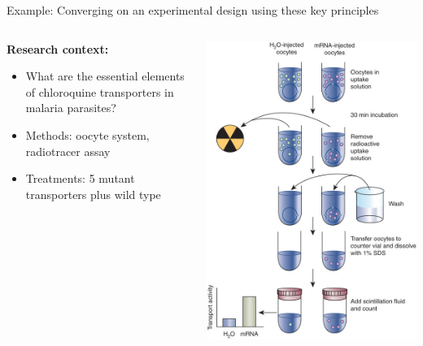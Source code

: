 \documentclass[10pt]{beamer}
\begin{document}
\begin{frame}{Example: Converging on an experimental design using these key principles}
 \begin{columns}
  \begin{column}{0.5\textwidth}
  \textbf{Research context:}
    \begin{itemize}
     \item What are the essential elements of chloroquine transporters in malaria parasites?
     \item Methods: oocyte system, radiotracer assay
     \item Treatments: 5 mutant transporters plus wild type
    \end{itemize}
  \end{column}
  \begin{column}{0.5\textwidth}
    \includegraphics[height=0.8\textheight]{Figures/expdesign}
  \end{column}

 \end{columns}

\end{frame}
\end{document}
